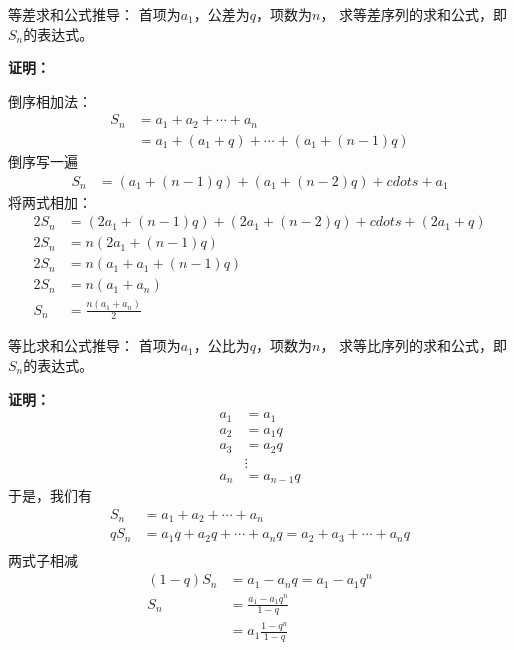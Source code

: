 \documentclass{article}
\begin{document}
\begin{zremark}
    等差求和公式推导： 首项为$a_1$，公差为$q$，项数为$n$，
    求等差序列的求和公式，即$S_n$的表达式。
\end{zremark}

\textbf{证明：}

倒序相加法：
\begin{align*}
    S_n & = a_1 + a_2 + \cdots + a_n                    \\
        & = a_1 + (a_1 + q) + \cdots + (a_1 + (n - 1)q)
\end{align*}
倒序写一遍
\begin{align*}
    S_n & = (a_1 + (n - 1)q) + (a_1 + (n - 2)q) + cdots + a_1
\end{align*}
将两式相加：
\begin{align*}
    2S_n & = (2a_1 + (n - 1)q) + (2a_1 + (n - 2)q) + cdots + (2a_1 + q) \\
    2S_n & = n(2a_1 + (n - 1)q)                                         \\
    2S_n & = n(a_1 + a_1 + (n - 1)q)                                    \\
    2S_n & = n(a_1 + a_n)                                               \\
    S_n  & = \frac{n(a_1 + a_n)}{2}
\end{align*}


\begin{zremark}
    等比求和公式推导： 首项为$a_1$，公比为$q$，项数为$n$，
    求等比序列的求和公式，即$S_n$的表达式。
\end{zremark}

\textbf{证明：}
\begin{align*}
    a_1 & = a_1       \\
    a_2 & = a_1 q     \\
    a_3 & = a_2 q     \\
        & \vdots      \\
    a_n & = a_{n-1} q
\end{align*}
于是，我们有
\begin{align*}
    S_n   & = a_1 + a_2 + \cdots + a_n                                    \\
    q S_n & = a_1 q + a_2 q + \cdots + a_n q = a_2 + a_3 + \cdots + a_n q \\
\end{align*}
两式子相减
\begin{align*}
    (1 - q) S_n & = a_1 - a_n q = a_1 - a_1 q^n \\
    S_n         & = \frac{a_1 - a_1 q^n}{1 - q} \\
                & = a_1 \frac{1 - q^n}{1 - q}
\end{align*}
\end{document}
